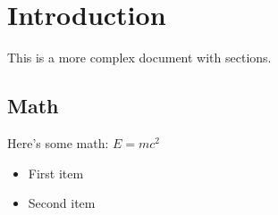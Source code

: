 \documentclass{article}
\begin{document}
\section{Introduction}
This is a more complex document with sections.

\subsection{Math}
Here's some math: $E = mc^2$

\begin{itemize}
\item First item
\item Second item
\end{itemize}
\end{document}
